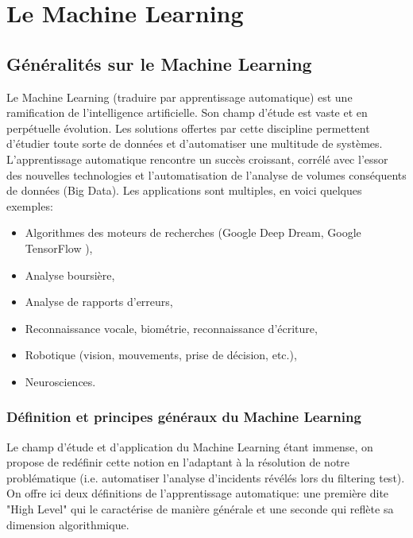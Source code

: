 \chapter{ Le  Machine Learning}
\label{Le Machine Learning}
\thispagestyle{fancy}




\section{Généralités sur le Machine Learning}
\label{Le Machine Learning: Généralités sur le Machine Learning}
Le Machine Learning (traduire par apprentissage automatique) est une ramification de l'intelligence artificielle. Son champ d'étude est vaste et en perpétuelle évolution. Les solutions offertes par cette discipline permettent d'étudier toute sorte de données et d'automatiser une multitude de systèmes. L'apprentissage automatique rencontre un succès croissant, corrélé avec l'essor des nouvelles technologies et l'automatisation de l'analyse de volumes conséquents de données (Big Data). Les applications sont multiples, en voici quelques exemples:  

\begin{itemize}
	\item Algorithmes des moteurs de recherches (Google Deep Dream\cite{DeepDream}, Google TensorFlow \cite{TensorFlow}),
	\item Analyse boursière,
	\item Analyse de rapports d'erreurs,
	\item Reconnaissance vocale, biométrie, reconnaissance d'écriture,
	\item Robotique (vision, mouvements, prise de décision, etc.),
	\item Neurosciences.
\end{itemize}



\subsection{Définition et principes généraux du Machine Learning}
\label{Le Machine Learning: Généralités sur le Machine Learning: Définition et principe général}
Le champ d'étude et d'application du Machine Learning étant immense, on propose de redéfinir cette notion en l'adaptant à la résolution de notre problématique (i.e. automatiser l'analyse d'incidents révélés lors du filtering test).
On offre ici deux définitions de l'apprentissage automatique: une première dite "High Level" qui le caractérise de manière générale et une seconde qui reflète sa dimension algorithmique. 

